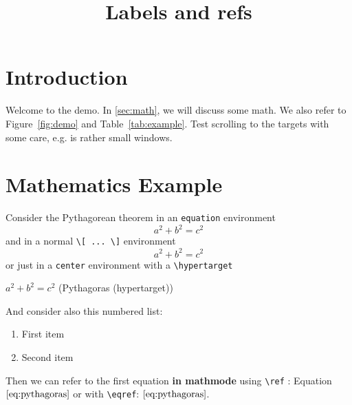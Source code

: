\documentclass{ximera}
\title{Labels and refs}
\begin{document}
\begin{abstract}
\end{abstract}
\maketitle



\section{Introduction}
\label{sec:intro}

Welcome to the demo. In \autoref{sec:math}, we will discuss some math.
We also refer to Figure~\ref{fig:demo} and Table~\ref{tab:example}.
Test scrolling to the targets with some care, e.g. is rather small windows.

\section{Mathematics Example}
\label{sec:math}

Consider the Pythagorean theorem in an \verb|equation| environment
\begin{equation}
  a^2 + b^2 = c^2   \label{eq:pythagoras}
\end{equation}
and in a normal \verb|\[ ... \]| environment
\[
  a^2 + b^2 = c^2   \tag{Pythagoras} \label{eq:tag:pythagoras}
\]
or just in a \verb|center| environment with a \verb|\hypertarget|
\begin{center}
  $a^2 + b^2 = c^2$  \hfill  \hypertarget{ht:pythagoras}{(Pythagoras (hypertarget))}
\end{center}

And consider also this numbered list:
\begin{enumerate}
  \item First item \label{itm:first}
  \item Second item \label{itm:second}
\end{enumerate}


Then we can refer to the first equation \textbf{in mathmode} using \verb|\ref| : Equation~$\ref{eq:pythagoras}$ or with \verb|\eqref|: $\eqref{eq:pythagoras}$.
\end{document}
